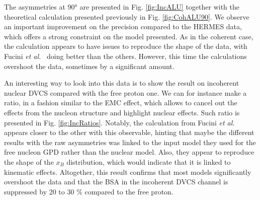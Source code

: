 \documentclass{article}
\begin{document}
The asymmetries at 90° are presented in Fig. \ref{fig:IncALU} together with the theoretical
calculation presented previously in Fig. \ref{fig:CohALU90}. We observe an important improvement
on the precision compared to 
the HERMES data, which offers a strong constraint on the model presented. As in the
coherent case, the calculation appears to have issues to reproduce the shape of the data,
with Fucini {\it et al.}~\cite{Fucini:2019xlc} doing better than the others.
However, this time the calculations overshoot the data, sometimes by a significant amount.

An interesting way to look into this data is to show the result on incoherent nuclear DVCS compared 
with the free proton one. We can for instance make a ratio, in a fashion similar to the EMC 
effect, which allows to cancel out
the effects from the nucleon structure and highlight nuclear effects. Such ratio is presented
in Fig. \ref{fig:IncRatios}.
Notably, the calculation from Fucini {\it et al.}~\cite{Fucini:2019xlc} appears closer to the
other with this observable, hinting that maybe the different results with the raw asymmetries 
was linked to the input model they used for the free nucleon GPD rather than the nuclear model. 
Also, they appear to reproduce the 
shape of the $x_B$ distribution, which would indicate that it is linked to kinematic effects.
Altogether, this result confirms that most models significantly overshoot the data and that 
the BSA in the incoherent DVCS channel is suppressed by 20 to 30 \% compared to the free proton.
\end{document}
